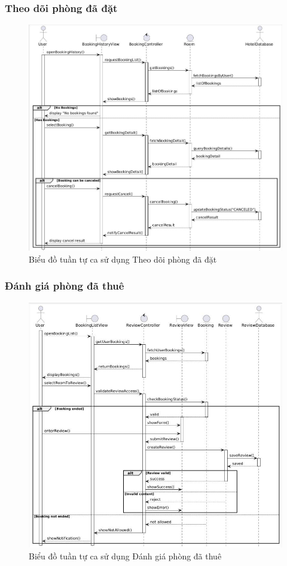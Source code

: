 \subsubsection{Theo dõi phòng đã đặt}
\begin{figure}[H]
    \centering
    \includegraphics[width=\textwidth]{img2/xemphongdathue.jpg}
    \caption{Biểu đồ tuần tự ca sử dụng Theo dõi phòng đã đặt}
\end{figure}

\subsubsection{Đánh giá phòng đã thuê}
\begin{figure}[H]
    \centering
    \includegraphics[width=\textwidth]{img2/danhgia.jpg}
    \caption{Biểu đồ tuần tự ca sử dụng Đánh giá phòng đã thuê}
\end{figure}

